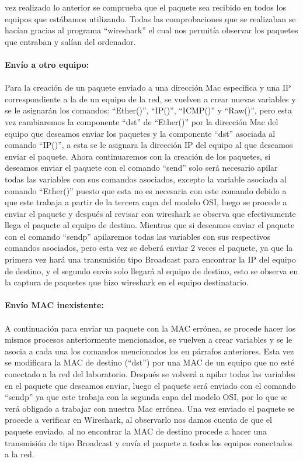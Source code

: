 \documentclass{udpreport}
\begin{document}
		vez realizado lo anterior se comprueba que el paquete sea recibido en todos los equipos que estábamos utilizando.
		Todas las comprobaciones que se realizaban se hacían gracias al programa “wireshark” el cual nos permitía observar los
		paquetes que entraban y salían del ordenador.\\\\
		{\bf \large Envío a otro equipo:}\\\\
		Para la creación de un paquete enviado a una dirección Mac específica y una IP correspondiente a la de un equipo de la
		red, se vuelven a crear nuevas variables y se le asignarán los comandos: “Ether()”, “IP()”, “ICMP()” y “Raw()”, pero
		esta vez cambiaremos la componente “dst” de “Ether()” por la dirección Mac del equipo que deseamos enviar los paquetes
		y la componente “dst” asociada al comando “IP()”, a esta se le asignara la dirección IP del equipo al que deseamos
		enviar el paquete. Ahora continuaremos con la creación de los paquetes, si deseamos enviar el paquete con el comando
		“send” solo será necesario apilar todas las variables con sus comandos asociados, excepto la variable asociada al
		comando “Ether()” puesto que esta no es necesaria con este comando debido a que este trabaja a partir de la tercera
		capa del modelo OSI, luego se procede a enviar el paquete y  después al revisar con wireshark se observa que
		efectivamente llega el paquete al equipo de destino. Mientras que si deseamos enviar el paquete con el comando “sendp”
		apilaremos todas las variables con sus respectivos comandos asociados,  pero esta vez se deberá enviar 2 veces el
		paquete, ya que la primera vez hará una transmisión tipo Broadcast para encontrar la IP del equipo de destino, y el
		segundo envio solo llegará al equipo de destino, esto se observa en la captura de paquetes que hizo wireshark en el
		equipo destinatario.\\\\
		{\bf \large Envío MAC inexistente:}\\\\
		A continuación para enviar un paquete con la MAC errónea, se procede hacer los mismos procesos anteriormente
		mencionados, se vuelven a crear variables y se le asocia a cada una los comandos mencionados los en párrafos
		anteriores. Esta vez se modificara la MAC de destino (“dst”)  por una MAC de un equipo que no esté conectado a la red
		del laboratorio. Después se volverá a apilar todas las variables en el paquete que deseamos enviar, luego el paquete
		será enviado con el comando “sendp” ya que este trabaja con la segunda capa del modelo OSI, por lo que se verá
		obligado a trabajar con nuestra Mac errónea. Una vez enviado el paquete se procede a verificar en Wireshark, al
		observarlo nos damos cuenta de que el paquete enviado, al no encontrar la MAC de destino procede a hacer una
		transmisión de tipo Broadcast y envía el paquete a todos los equipos conectados a la red.
\end{document}
